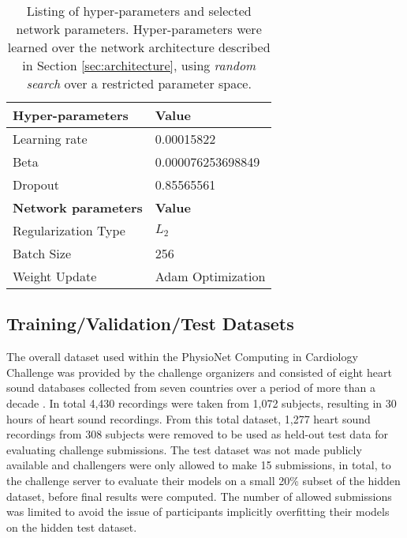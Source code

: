 \documentclass{article}
\begin{document}
\begin{table}
  \centering
  \begin{tabular}{|l|l|}
    \hline
	\bf{Hyper-parameters} & \bf{Value}\\
	\hline
     	Learning rate & 0.00015822\\
     	\hline
	Beta & 0.000076253698849\\
     	\hline
	Dropout & 0.85565561\\	
     	\hline
	\bf{Network parameters} & \bf{Value}\\
	\hline
     	Regularization Type & $L_2$\\
     	\hline
	Batch Size & 256\\
     	\hline
	Weight Update & Adam Optimization\\		
    \hline
	\end{tabular}
  \caption{Listing of hyper-parameters and selected network parameters. Hyper-parameters were learned over the network architecture described in Section \ref{sec:architecture}, using \emph{random search} over a restricted parameter space.}
  \label{tab:hyperparameters}
\end{table}

\subsection{Training/Validation/Test Datasets}

The overall dataset used within the PhysioNet Computing in Cardiology Challenge was provided by the challenge organizers and consisted of eight heart sound databases collected from seven countries over a period of more than a decade \cite{clifford2016classification}. In total 4,430 recordings were taken from 1,072 subjects, resulting in 30 hours of heart sound recordings. From this total dataset, 1,277 heart sound recordings from 308 subjects were removed to be used as held-out test data for evaluating challenge submissions. The test dataset was not made publicly available and challengers were only allowed to make 15 submissions, in total, to the challenge server to evaluate their models on a small 20\% subset of the hidden dataset, before final results were computed. The number of allowed submissions was limited to avoid the issue of participants implicitly overfitting their models on the hidden test dataset. 
\end{document}
